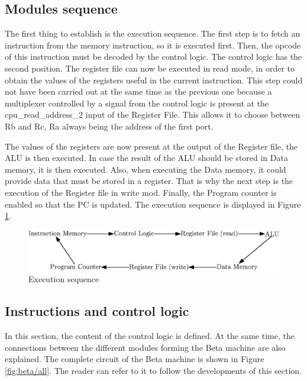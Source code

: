 \subsection{Modules sequence}

The first thing to establish is the execution sequence.  The first step is to fetch an instruction 
from the memory instruction, so it is executed first. Then, the opcode of this instruction must be 
decoded by the control logic. The control logic has the second position. The register file can now 
be executed in read mode, in order to obtain the values of the registers useful in the current 
instruction. This step could not have been carried out at the same time as the previous one because 
a multiplexer controlled by a signal from the control logic is present at the cpu\_read\_address\_2 
input of the Register File. This allows it to choose between Rb and Rc, Ra always being the address 
of the first port. 

The values of the registers are now present at the output of the Register file, the ALU is then 
executed. In case the result of the ALU should be stored in Data memory, it is then executed. Also, when 
executing the Data memory, it could provide data that must be stored in a register. That is why the 
next step is the execution of the Register file in write mod. Finally, the Program counter is enabled 
so that the PC is updated. The execution sequence is displayed in Figure \ref{fig:beta/sequence}.

\begin{figure}[H]
    \centering
    \includegraphics[scale=0.8]{Chapter3-CPU/res/sequence}
    \caption{Execution sequence}
    \label{fig:beta/sequence}
\end{figure}

\subsection{Instructions and control logic}

In this section, the content of the control logic is defined. At the same time, the connections 
between the different modules forming the Beta machine are also explained. The complete circuit of 
the Beta machine is shown in Figure \ref{fig:beta/all}. The reader can refer to it to follow the 
developments of this section.

